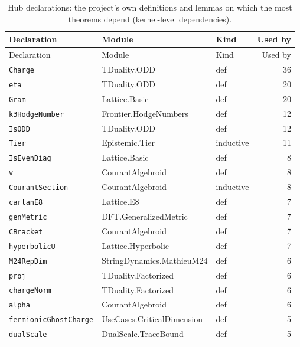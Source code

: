 \begin{longtable}{p{}p{}lr}
\caption{Hub declarations: the project's own definitions and lemmas on which the most theorems depend (kernel-level dependencies).}\label{tab:atlas-hubs}\\
\toprule
Declaration & Module & Kind & Used by \\ \midrule \endfirsthead
\toprule
Declaration & Module & Kind & Used by \\ \midrule \endhead
\bottomrule \endfoot
\texttt{\small Charge} & {\scriptsize TDuality.ODD} & def & 36 \\
\texttt{\small eta} & {\scriptsize TDuality.ODD} & def & 20 \\
\texttt{\small Gram} & {\scriptsize Lattice.Basic} & def & 20 \\
\texttt{\small k3HodgeNumber} & {\scriptsize Frontier.HodgeNumbers} & def & 12 \\
\texttt{\small IsODD} & {\scriptsize TDuality.ODD} & def & 12 \\
\texttt{\small Tier} & {\scriptsize Epistemic.Tier} & inductive & 11 \\
\texttt{\small IsEvenDiag} & {\scriptsize Lattice.Basic} & def & 8 \\
\texttt{\small v} & {\scriptsize CourantAlgebroid} & def & 8 \\
\texttt{\small CourantSection} & {\scriptsize CourantAlgebroid} & inductive & 8 \\
\texttt{\small cartanE8} & {\scriptsize Lattice.E8} & def & 7 \\
\texttt{\small genMetric} & {\scriptsize DFT.GeneralizedMetric} & def & 7 \\
\texttt{\small CBracket} & {\scriptsize CourantAlgebroid} & def & 7 \\
\texttt{\small hyperbolicU} & {\scriptsize Lattice.Hyperbolic} & def & 7 \\
\texttt{\small M24RepDim} & {\scriptsize StringDynamics.MathieuM24} & def & 6 \\
\texttt{\small proj} & {\scriptsize TDuality.Factorized} & def & 6 \\
\texttt{\small chargeNorm} & {\scriptsize TDuality.Factorized} & def & 6 \\
\texttt{\small alpha} & {\scriptsize CourantAlgebroid} & def & 6 \\
\texttt{\small fermionicGhostCharge} & {\scriptsize UseCases.CriticalDimension} & def & 5 \\
\texttt{\small dualScale} & {\scriptsize DualScale.TraceBound} & def & 5 \\

\end{longtable}
